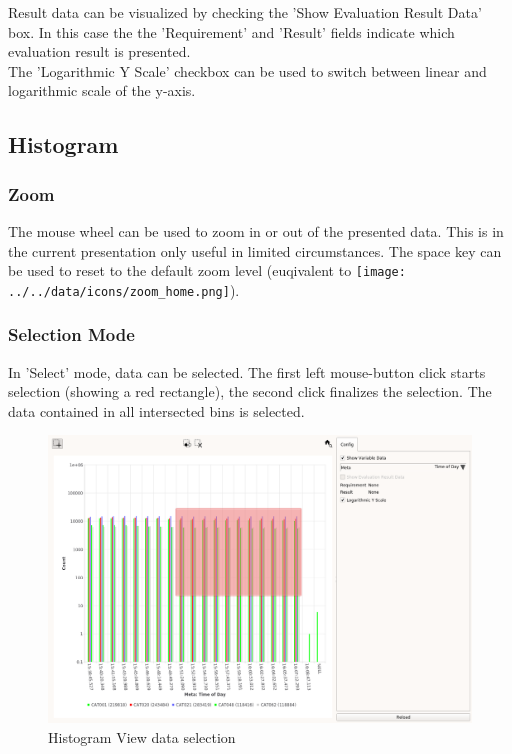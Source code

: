 Result data can be visualized by checking the 'Show Evaluation Result Data' box. 
In this case the the 'Requirement' and 'Result' fields indicate which evaluation result is presented. \\

The 'Logarithmic Y Scale' checkbox can be used to switch between linear and logarithmic scale of the y-axis. \\

\subsection{Histogram}

\subsubsection{Zoom}

The mouse wheel can be used to zoom in or out of the presented data. This is in the current presentation only useful in limited circumstances. The space key can be used to reset to the default zoom level (euqivalent to \texttt{[image: ../../data/icons/zoom\_home.png]}).

\subsubsection{Selection Mode}

In 'Select' mode, data can be selected. The first left mouse-button click starts selection (showing a red rectangle), the second click finalizes the selection. The data contained in all intersected bins is selected.

\begin{figure}[H]
    \hspace*{-2cm}
    \includegraphics[width=18cm,frame]{figures/histogram_select.png}
  \caption{Histogram View data selection}
\end{figure}

